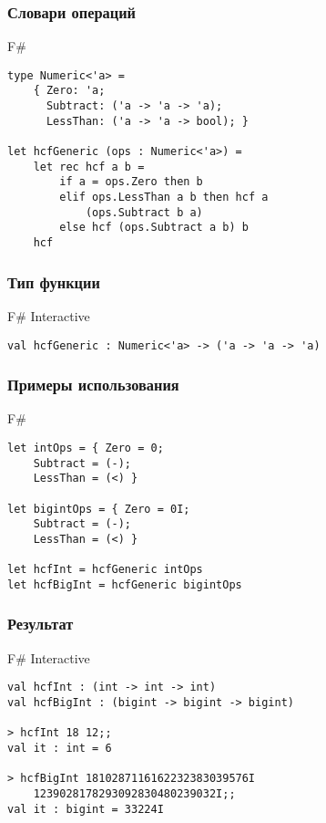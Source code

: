 \documentclass[xetex,mathserif,serif]{beamer}
\begin{document}
	\begin{frame}[fragile]
		\frametitle{Словари операций}
		\begin{exampleblock}{F\#}
			\begin{lstlisting}
type Numeric<'a> =
    { Zero: 'a;
      Subtract: ('a -> 'a -> 'a);
      LessThan: ('a -> 'a -> bool); }

let hcfGeneric (ops : Numeric<'a>) =
    let rec hcf a b =
        if a = ops.Zero then b
        elif ops.LessThan a b then hcf a 
            (ops.Subtract b a)
        else hcf (ops.Subtract a b) b
    hcf
\end{lstlisting}
\end{exampleblock}
\end{frame}

	\begin{frame}[fragile]
		\frametitle{Тип функции}
\begin{alertblock}{F\# Interactive}
\begin{lstlisting}[keywordstyle=\color{black}]
val hcfGeneric : Numeric<'a> -> ('a -> 'a -> 'a)
\end{lstlisting}
\end{alertblock}
\end{frame}

	\begin{frame}[fragile]
		\frametitle{Примеры использования}
		\begin{exampleblock}{F\#}
			\begin{lstlisting}
let intOps = { Zero = 0; 
    Subtract = (-); 
    LessThan = (<) }
    
let bigintOps = { Zero = 0I; 
    Subtract = (-); 
    LessThan = (<) }

let hcfInt = hcfGeneric intOps
let hcfBigInt = hcfGeneric bigintOps
\end{lstlisting}
\end{exampleblock}
\end{frame}

	\begin{frame}[fragile]
		\frametitle{Результат}
\begin{alertblock}{F\# Interactive}
\begin{lstlisting}[keywordstyle=\color{black}]
val hcfInt : (int -> int -> int)
val hcfBigInt : (bigint -> bigint -> bigint)

> hcfInt 18 12;;
val it : int = 6

> hcfBigInt 1810287116162232383039576I 
    1239028178293092830480239032I;;
val it : bigint = 33224I
\end{lstlisting}
\end{alertblock}
\end{frame}
\end{document}
